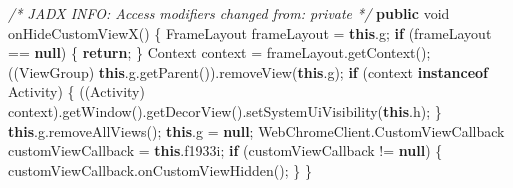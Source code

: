 \documentclass[
]{article}
\newenvironment{Shaded}{}{}
\newcommand{\BuiltInTok}[1]{\textcolor[rgb]{0.00,0.50,0.00}{#1}}
\newcommand{\CommentTok}[1]{\textcolor[rgb]{0.38,0.63,0.69}{\textit{#1}}}
\newcommand{\ControlFlowTok}[1]{\textcolor[rgb]{0.00,0.44,0.13}{\textbf{#1}}}
\newcommand{\DataTypeTok}[1]{\textcolor[rgb]{0.56,0.13,0.00}{#1}}
\newcommand{\FunctionTok}[1]{\textcolor[rgb]{0.02,0.16,0.49}{#1}}
\newcommand{\KeywordTok}[1]{\textcolor[rgb]{0.00,0.44,0.13}{\textbf{#1}}}
\newcommand{\NormalTok}[1]{#1}
\newcommand{\OperatorTok}[1]{\textcolor[rgb]{0.40,0.40,0.40}{#1}}
\begin{document}
\begin{Shaded}
\begin{Highlighting}[]
    \CommentTok{/* JADX INFO: Access modifiers changed from: private */}
    \KeywordTok{public} \DataTypeTok{void} \FunctionTok{onHideCustomViewX}\OperatorTok{()} \OperatorTok{\{}
\NormalTok{        FrameLayout frameLayout }\OperatorTok{=} \KeywordTok{this}\OperatorTok{.}\FunctionTok{g}\OperatorTok{;}
        \ControlFlowTok{if} \OperatorTok{(}\NormalTok{frameLayout }\OperatorTok{==} \KeywordTok{null}\OperatorTok{)} \OperatorTok{\{}
            \ControlFlowTok{return}\OperatorTok{;}
        \OperatorTok{\}}
        \BuiltInTok{Context}\NormalTok{ context }\OperatorTok{=}\NormalTok{ frameLayout}\OperatorTok{.}\FunctionTok{getContext}\OperatorTok{();}
        \OperatorTok{((}\NormalTok{ViewGroup}\OperatorTok{)} \KeywordTok{this}\OperatorTok{.}\FunctionTok{g}\OperatorTok{.}\FunctionTok{getParent}\OperatorTok{()).}\FunctionTok{removeView}\OperatorTok{(}\KeywordTok{this}\OperatorTok{.}\FunctionTok{g}\OperatorTok{);}
        \ControlFlowTok{if} \OperatorTok{(}\NormalTok{context }\KeywordTok{instanceof}\NormalTok{ Activity}\OperatorTok{)} \OperatorTok{\{}
            \OperatorTok{((}\NormalTok{Activity}\OperatorTok{)}\NormalTok{ context}\OperatorTok{).}\FunctionTok{getWindow}\OperatorTok{().}\FunctionTok{getDecorView}\OperatorTok{().}\FunctionTok{setSystemUiVisibility}\OperatorTok{(}\KeywordTok{this}\OperatorTok{.}\FunctionTok{h}\OperatorTok{);}
        \OperatorTok{\}}
        \KeywordTok{this}\OperatorTok{.}\FunctionTok{g}\OperatorTok{.}\FunctionTok{removeAllViews}\OperatorTok{();}
        \KeywordTok{this}\OperatorTok{.}\FunctionTok{g} \OperatorTok{=} \KeywordTok{null}\OperatorTok{;}
\NormalTok{        WebChromeClient}\OperatorTok{.}\FunctionTok{CustomViewCallback}\NormalTok{ customViewCallback }\OperatorTok{=} \KeywordTok{this}\OperatorTok{.}\FunctionTok{f1933i}\OperatorTok{;}
        \ControlFlowTok{if} \OperatorTok{(}\NormalTok{customViewCallback }\OperatorTok{!=} \KeywordTok{null}\OperatorTok{)} \OperatorTok{\{}
\NormalTok{            customViewCallback}\OperatorTok{.}\FunctionTok{onCustomViewHidden}\OperatorTok{();}
        \OperatorTok{\}}
    \OperatorTok{\}}


\end{Highlighting}
\end{Shaded}
\end{document}
